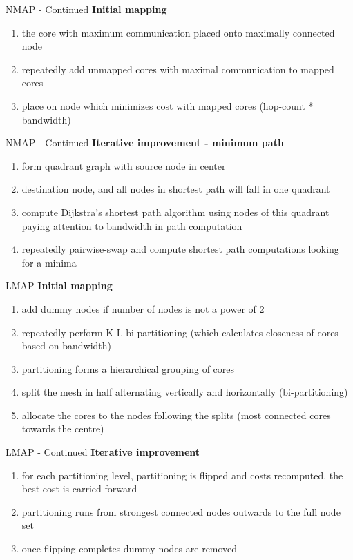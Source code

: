 \documentclass{beamer}
\begin{document}
\begin{frame}{NMAP - Continued}
	\textbf{Initial mapping}
	\begin{enumerate}
		\item the core with maximum communication placed onto maximally connected node
		\item repeatedly add unmapped cores with maximal communication to mapped cores
		\item place on node which minimizes cost with mapped cores (hop-count * bandwidth)
	\end{enumerate}
\end{frame}

\begin{frame}{NMAP - Continued}
	\textbf{Iterative improvement - minimum path}
	\begin{enumerate}
		\item form quadrant graph with source node in center
		\item destination node, and all nodes in shortest path will fall in one quadrant
		\item compute Dijkstra's shortest path algorithm using nodes of this quadrant paying attention to bandwidth in path computation
		\item repeatedly pairwise-swap and compute shortest path computations looking for a minima
	\end{enumerate}
\end{frame}

\begin{frame}{LMAP}
	\textbf{Initial mapping}
	\begin{enumerate}
		\item add dummy nodes if number of nodes is not a power of 2
		\item repeatedly perform K-L bi-partitioning (which calculates closeness of cores based on bandwidth)
		\item partitioning forms a hierarchical grouping of cores
		\item split the mesh in half alternating vertically and horizontally (bi-partitioning)
		\item allocate the cores to the nodes following the splits (most connected cores towards the centre)
	\end{enumerate}
\end{frame}

\begin{frame}{LMAP - Continued}
	\textbf{Iterative improvement}
	\begin{enumerate}
		\item for each partitioning level, partitioning is flipped and costs recomputed. the best cost is carried forward
		\item partitioning runs from strongest connected nodes outwards to the full node set
		\item once flipping completes dummy nodes are removed
	\end{enumerate}
\end{frame}
\end{document}

